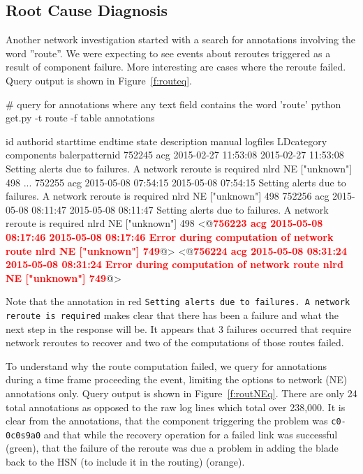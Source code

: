 \subsection{Root Cause Diagnosis}
\label{s:route}
Another network investigation started with a search for annotations involving the word ''route''.
We were expecting to see events about reroutes triggered as a result of component failure. More interesting
are cases where the reroute failed. Query output is shown in Figure~\ref{f:routeq}.

\begin{figure*}
\begin{annol}
# query for annotations where any text field contains the word 'route'
python get.py -t route -f table annotations

id	authorid	starttime	endtime	state	description	manual	logfiles LDcategory	components	balerpatternid
752245	acg	2015-02-27 11:53:08	2015-02-27 11:53:08	Setting alerts due to failures. A network reroute is required	nlrd	NE	["unknown"]	498
...
752255	acg	2015-05-08 07:54:15	2015-05-08 07:54:15	Setting alerts due to failures. A network reroute is required	nlrd	NE	["unknown"]	498
752256	acg	2015-05-08 08:11:47	2015-05-08 08:11:47	Setting alerts due to failures. A network reroute is required	nlrd	NE	["unknown"]	498
<@\textbf{\textcolor{red}{756223	acg	2015-05-08 08:17:46	2015-05-08 08:17:46	Error during computation of network route    nlrd	NE	["unknown"]	749}}@>
<@\textbf{\textcolor{red}{756224	acg	2015-05-08 08:31:24	2015-05-08 08:31:24	Error during computation of network route    nlrd	NE	["unknown"]	749}}@>
\end{annol}
\caption{Output of query for route annotations. Complete output = 15 annotations. Occurrences of network reroutes and failures in the rerouting process are of interest.}
\label{f:routeq}
\end{figure*}

Note that the annotation in red \texttt{Setting alerts due to failures. A network reroute is required} makes clear that there has been a failure and what the next step in the response will be. It appears that 3 failures occurred that require network reroutes to recover and two of the computations of those routes failed.

To understand why the route computation failed, we query for annotations during a time frame proceeding the event, limiting the options to network (NE) annotations only.
Query output is shown in Figure~\ref{f:routNEq}. There are only 24 total annotations as opposed to the raw log lines which total over 238,000.
It is clear from the annotations, that the component triggering the problem was \texttt{c0-0c0s9a0} and that
while the recovery operation for a failed link was successful (green), that the
failure of the reroute was due a problem in adding the blade back to the HSN (to include it in the routing) (orange).


